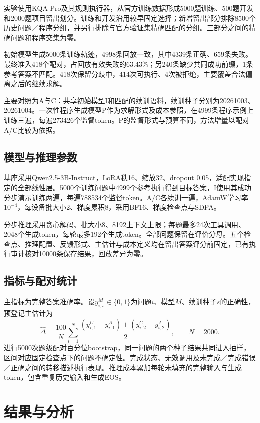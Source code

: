 实验使用KQA Pro及其规则执行器\cite{cao2022kqapro}，从官方训练数据形成5000题训练、500题开发和2000题项目留出划分。训练和开发沿用较早固定选择；新增留出部分排除8500个历史问题／程序分组，并另行排除与官方验证集精确匹配的分组。三部分之间的精确问题和程序交集为零。

初始模型生成5000条训练轨迹，4998条回放一致，其中4339条正确、659条失败。最终准入418个配对，占回放有效失败的63.43\%；另240条缺少共同成功前缀，1条参考答案不匹配。418次保留分歧中，414次可执行、4次被拒绝，主要覆盖合法偏离之后的继续求解。

主要对照为A与C：共享初始模型I和匹配的续训语料，续训种子分别为20261003、20261004。一次性程序生成模型P作为求解形式及成本参照，在4999条程序示例上训练三遍，每遍273426个监督token。P的监督形式与预算不同，方法增量以配对A/C比较为依据。

\subsection{模型与推理参数}

基座采用Qwen2.5-3B-Instruct\cite{qwen2024qwen25}，LoRA秩16、缩放32、dropout 0.05，适配实现指定的全部线性层\cite{hu2022lora}。5000个训练问题中4999个参考执行得到目标答案，I使用其成功分步演示训练两遍，每遍788534个监督token。A/C各续训一遍，AdamW学习率$10^{-4}$，每设备批大小2、梯度累积8，采用BF16、梯度检查点与SDPA。

分步推理采用贪心解码、批大小8、8192上下文上限；每题最多24次工具调用、2048个生成token，每轮最多192个生成token。全部问题保留在评价分母。五个检查点、推理配置、反馈形式、主估计与成本定义均在留出答案评分前固定，已有执行审计核对10000条保存结果，回放差异为零。

\subsection{指标与配对统计}

主指标为完整答案准确率。设$y_{i,s}^{M}\in\{0,1\}$为问题$i$、模型$M$、续训种子$s$的正确性，预登记主估计为
\begin{equation}
 \widehat\Delta=\frac{100}{N}\sum_{i=1}^{N}
 \frac{(y_{i,1}^{C}-y_{i,1}^{A})+(y_{i,2}^{C}-y_{i,2}^{A})}{2},
 \qquad N=2000.
\end{equation}
进行5000次题级配对百分位bootstrap，同一问题的两个种子结果共同进入抽样，区间对应固定检查点下的问题不确定性。完成状态、无效调用及未完成／完成错误／正确之间的转移描述执行表现。推理成本累加每轮未填充的完整输入与生成token，包含重复历史输入和生成EOS。

\section{结果与分析}

